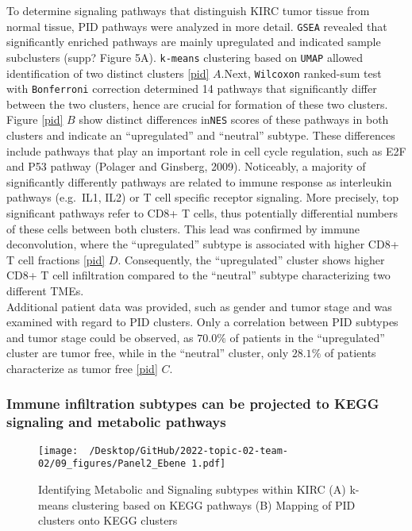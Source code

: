 \documentclass[
  parskip,
  oneside]{scrreprt}
\begin{document}
To determine signaling pathways that distinguish KIRC tumor tissue from
normal tissue, PID pathways were analyzed in more detail. \texttt{GSEA}
revealed that significantly enriched pathways are mainly upregulated and
indicated sample subclusters (supp? Figure 5A). \texttt{k-means}
clustering based on \texttt{UMAP} allowed identification of two distinct
clusters \cref{pid} \(A\).Next, \texttt{Wilcoxon} ranked-sum test with
\texttt{Bonferroni} correction determined 14 pathways that significantly
differ between the two clusters, hence are crucial for formation of
these two clusters. Figure \cref{pid} \(B\) show distinct differences
in\texttt{NES} scores of these pathways in both clusters and indicate an
``upregulated'' and ``neutral'' subtype. These differences include
pathways that play an important role in cell cycle regulation, such as
E2F and P53 pathway (Polager and Ginsberg, 2009). Noticeably, a majority
of significantly differently pathways are related to immune response as
interleukin pathways (e.g.~IL1, IL2) or T cell specific receptor
signaling. More precisely, top significant pathways refer to CD8+ T
cells, thus potentially differential numbers of these cells between both
clusters. This lead was confirmed by immune deconvolution, where the
``upregulated'' subtype is associated with higher CD8+ T cell fractions
\cref{pid} \(D\). Consequently, the ``upregulated'' cluster shows higher
CD8+ T cell infiltration compared to the ``neutral'' subtype
characterizing two different TMEs.\\
Additional patient data was provided, such as gender and tumor stage and
was examined with regard to PID clusters. Only a correlation between PID
subtypes and tumor stage could be observed, as \(70.0\%\) of patients in
the ``upregulated'' cluster are tumor free, while in the ``neutral''
cluster, only \(28.1\%\) of patients characterize as tumor free
\cref{pid} \(C\).

\hypertarget{immune-infiltration-subtypes-can-be-projected-to-kegg-signaling-and-metabolic-pathways}{%
\subsubsection{Immune infiltration subtypes can be projected to KEGG
signaling and metabolic
pathways}\label{immune-infiltration-subtypes-can-be-projected-to-kegg-signaling-and-metabolic-pathways}}

\begin{figure}[h]
  \texttt{[image: ~/Desktop/GitHub/2022-topic-02-team-02/09\_figures/Panel2\_Ebene 1.pdf]}
  \caption{Identifying Metabolic and Signaling subtypes within KIRC (A) k-means clustering based on KEGG pathways (B) Mapping of PID clusters onto KEGG clusters}
  \label{kegg}
\end{figure}
\end{document}
